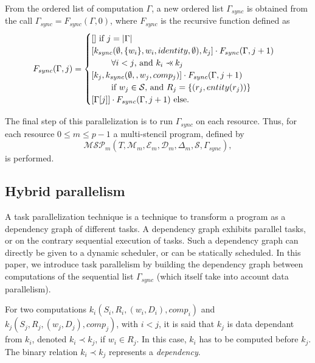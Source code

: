 \begin{mydef}
From the ordered list of computation $\Gamma$, a new ordered list $\Gamma_{sync}$ is obtained from the call $\Gamma_{sync} = F_{sync}(\Gamma,0)$, where $F_{sync}$ is the recursive function defined as
\begin{equation*}
F_{sync}(\Gamma,j) = 
\begin{cases} 	[] \mbox{ if }j=|\Gamma|\\
				[k_{sync}(\emptyset,\{w_i\},w_i,identity,\emptyset), k_j] \cdot F_{sync}(\Gamma,j+1)\\
				\text{ } \qquad \forall i<j \text{, and }k_i \pprec k_j\\
				[k_j, k_{sync}(\emptyset,,w_j,comp_j)] \cdot F_{sync}(\Gamma,j+1)\\ 
				\text{ } \qquad \mbox{if } w_j \in \mathcal{S} \text{, and } R_j=\{(r_j,entity(r_j))\}\\
				[\Gamma[j]] \cdot F_{sync}(\Gamma,j+1) \text{ else}.
\end{cases}
\end{equation*}
\end{mydef}


 The final step of this parallelization is to run $\Gamma_{sync}$ on each resource. Thus, for each resource $0 \leq m \leq p-1$ a multi-stencil program, defined by
\begin{equation}
\mathcal{MSP}_m(T,\mathcal{M}_m,\mathcal{E}_m,\mathcal{D}_m,\Delta_m,\mathcal{S},\Gamma_{sync}),
\end{equation}
is performed.

\subsection{Hybrid parallelism}
A task parallelization technique is a technique to transform a program as a dependency graph of different tasks. A dependency graph exhibits parallel tasks, or on the contrary sequential execution of tasks. Such a dependency graph can directly be given to a dynamic scheduler, or can be statically scheduled. In this paper, we introduce task parallelism by building the dependency graph between computations of the sequential list $\Gamma_{sync}$ (which itself take into account data parallelism).

\begin{mydef}
For two computations $k_i(S_i,R_i,(w_i,D_i),comp_i)$ and $k_j(S_j,R_j,(w_j,D_j),comp_j)$, with $i < j$, it is said that $k_j$ is data dependant from $k_i$, denoted $k_i\prec k_j$, if $w_i \in R_j$. In this case, $k_i$ has to be computed before $k_j$. The binary relation $k_i\prec k_j$ represents a \textit{dependency}.
\end{mydef}

